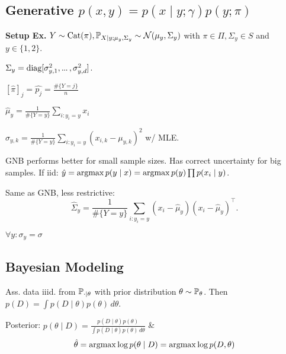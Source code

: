 \subsection[Generative]{Generative \(p(x, y) = p(x \mid y; \gamma) p(y; \pi)\)}
\textbf{Setup Ex.} \(Y \sim \cat(\pi), \P_{X \mid y; \mu_y, \Sigma_y} \sim \normal(\mu_y, \Sigma_y)\) with \(\pi \in \Pi, \Sigma_y \in S\) and \( y \in \{1, 2\}\).

\begin{definition}
  \(\Sigma_y = \text{diag}[\sigma_{y,1}^2, \sdots, \sigma_{y,d}^2]\).
  \begin{enumerate*}
    \item \([\hat{\pi}]_j = \hat{p_j} = \frac{\#\{Y = j\}}{n}\)
    \item \(\hat{\mu}_y = \frac{1}{\#\{Y = y\}} \sum_{i:y_i = y} x_i\)
    \item \(\hat{\sigma}_{y, k} = \frac{1}{\#\{Y = y\}} \sum_{i:y_i = y} (x_{i, k} - \mu_{y, k})^2\) w/ MLE.
  \end{enumerate*}
  GNB performs better for small sample sizes. Has correct uncertainty for big samples. If iid:
  \(\hat{y} = \argmax p(y \mid x) = \argmax p(y) \prod p(x_i \mid y)\).
\end{definition}

\begin{definition}
  Same as GNB, less restrictive: \[\hat{\Sigma}_y = \frac{1}{\#\{Y = y\}}\sum_{i:y_i = y} (x_i - \hat{\mu}_y)(x_i - \hat{\mu}_y)^\top.\]
\end{definition}

\begin{definition}
  \(\forall y: \sigma_y = \sigma\)
\end{definition}

\subsection{Bayesian Modeling}
Ass. data iiid. from \(\P_{\cdot \mid \theta}\) with prior distribution \(\theta \sim \P_\theta\). Then \(p(D) = \int p(D \mid \theta) p(\theta) \, d\theta\).

\begin{definition}[MAP]
  Posterior: \(p(\theta \mid D) = \frac{p(D \mid \theta) p(\theta)}{\int p(D \mid \theta) p(\theta) \, d\theta}\) \&
  \[\hat{\theta} = \argmax \log p(\theta \mid D) = \argmax \log p(D, \theta)\]
\end{definition}

